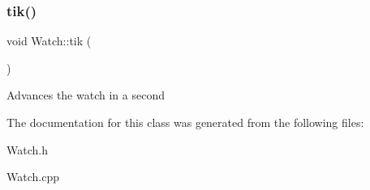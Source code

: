 \subsubsection{\texorpdfstring{tik()}{tik()}}
{\footnotesize\ttfamily void Watch\+::tik (\begin{DoxyParamCaption}{ }\end{DoxyParamCaption})}

Advances the watch in a second 

The documentation for this class was generated from the following files\+:\begin{DoxyCompactItemize}
\item 
Watch.\+h\item 
Watch.\+cpp\end{DoxyCompactItemize}
